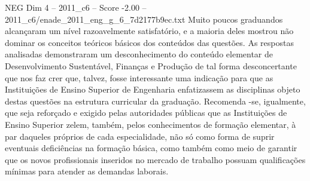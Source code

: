 \begin{textsample}{NEG Dim 4 – 2011\_c6 – Score -2.00 – 2011\_c6/enade\_2011\_eng\_g\_6\_7d2177b9ec.txt}
Muito poucos graduandos alcançaram um nível razoavelmente satisfatório, e a maioria deles mostrou não dominar os conceitos teóricos básicos dos conteúdos das questões.
As respostas analisadas demonstraram um desconhecimento do conteúdo elementar de Desenvolvimento Sustentável, Finanças e Produção de tal forma desconcertante que nos faz crer que, talvez, fosse interessante uma indicação para que as Instituições de Ensino Superior de Engenharia enfatizassem as disciplinas objeto destas questões na estrutura curricular da graduação.
Recomenda -se, igualmente, que seja reforçado e exigido pelas autoridades públicas que as Instituições de Ensino Superior zelem, também, pelos conhecimentos de formação elementar, à par daqueles próprios de cada especialidade, não só como forma de suprir eventuais deficiências na formação básica, como também como meio de garantir que os novos profissionais inseridos no mercado de trabalho possuam qualificações mínimas para atender as demandas laborais.

\end{textsample}
